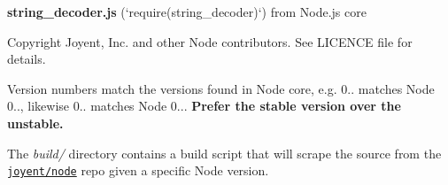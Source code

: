 {\bfseries string\+\_\+decoder.\+js} (`require(\textquotesingle{}string\+\_\+decoder\textquotesingle{})`) from Node.\+js core

Copyright Joyent, Inc. and other Node contributors. See L\+I\+C\+E\+N\+C\+E file for details.

Version numbers match the versions found in Node core, e.\+g. 0.. matches Node 0.., likewise 0.. matches Node 0... {\bfseries Prefer the stable version over the unstable.}

The {\itshape build/} directory contains a build script that will scrape the source from the \href{https://github.com/joyent/node}{\tt joyent/node} repo given a specific Node version. 